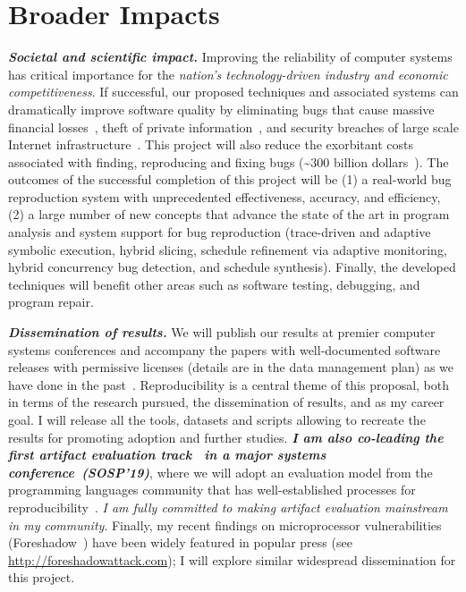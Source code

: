 \section{Broader Impacts}
\label{sec:broader}

\noindent \textit{\textbf{Societal and scientific impact.}} Improving the reliability of computer systems has critical importance for the \textit{nation's technology-driven industry and economic competitiveness}. If successful, our proposed techniques and associated systems can dramatically improve software quality by eliminating bugs that cause massive financial losses~\cite{blackout-bug,knights-bug-cost,heartbleed-cost}, theft of private information~\cite{equifax-breach}, and security breaches of large scale Internet infrastructure~\cite{mirai}. This project will also reduce the exorbitant costs associated with finding, reproducing and fixing bugs (\textasciitilde300 billion dollars~\cite{goodliffe_2015_BecomingBetterProgrammer,tombritton_2013_ReversibleDebuggingSoftware,seacord_2003_ModernizingLegacySystems}). The outcomes of the successful completion of this project will be (1) a real-world bug reproduction system with unprecedented effectiveness, accuracy, and efficiency, (2) a large number of new concepts that advance the state of the art in program analysis and system support for bug reproduction (trace-driven and adaptive symbolic execution, hybrid slicing, schedule refinement via adaptive monitoring, hybrid concurrency bug detection, and schedule synthesis). Finally, the developed techniques will benefit other areas such as software testing, debugging, and program repair.


\noindent \textit{\textbf{Dissemination of results.}}
We will publish our results at premier computer systems conferences and accompany the papers with well-documented software releases with permissive licenses (details are in the data management plan) as we have done in the past~\cite{racemob,gist,huron}. Reproducibility is a central theme of this proposal, both in terms of the research pursued, the dissemination of results, and as my career goal. I will release all the tools, datasets and scripts allowing to recreate the results for promoting adoption and further studies. \textbf{\textit{I am also co-leading the first artifact evaluation track~\cite{sysartifacts} in a major systems conference~(SOSP'19)}}, where we will adopt an evaluation model from the programming languages community that has well-established processes for reproducibility~\cite{pldiae}. \textit{I am fully committed to making artifact evaluation mainstream in my community}. Finally, my recent findings on microprocessor vulnerabilities (\ie Foreshadow~\cite{foreshadow,foreshadow-ng}) have been widely featured in popular press (see {\small \url{http://foreshadowattack.com}}); I will explore similar widespread dissemination for this project. 

